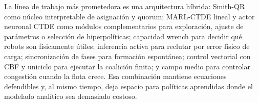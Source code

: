 La línea de trabajo más prometedora es una arquitectura híbrida: Smith-QR como núcleo
interpretable de asignación y quorum; MARL-CTDE lineal y actor neuronal CTDE como módulos
complementarios para exploración, ajuste de parámetros o selección de hiperpolíticas; capacidad wrench para decidir qué robots son físicamente útiles;
inferencia activa para reclutar por error físico de carga; sincronización de fases para
formación espontánea; control vectorial con CBF y uniciclo para ejecutar la coalición
finita; y campo medio para controlar congestión cuando la flota crece. Esa
combinación mantiene ecuaciones defendibles y, al mismo tiempo, deja espacio para
políticas aprendidas donde el modelado analítico sea demasiado costoso.
